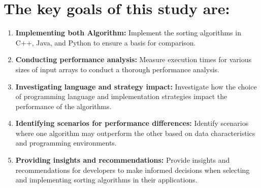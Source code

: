 \documentclass[twocolumn]{article}
\begin{document}
  \vspace{20pt}
  \section*{The key goals of this study are:}
  
  \begin{enumerate}
	  \item \textbf{Implementing both Algorithm:}
	  Implement the sorting algorithms in C++, Java, and Python to ensure a basis for comparison.
	  
	  \item \textbf{Conducting performance analysis:}
	  Measure execution times for various sizes of input arrays to conduct a thorough performance analysis.
	  
	  \item \textbf{Investigating language and strategy impact:}
	  Investigate how the choice of programming language and implementation strategies impact the performance of the algorithms.
	  
	  \item \textbf{Identifying scenarios for performance differences:}
	  Identify scenarios where one algorithm may outperform the other based on data characteristics and programming environments.
	  
	  \item \textbf{Providing insights and recommendations:}
	  Provide insights and recommendations for developers to make informed decisions when selecting and implementing sorting algorithms in their applications.
  \end{enumerate}
  
  
\end{document}
